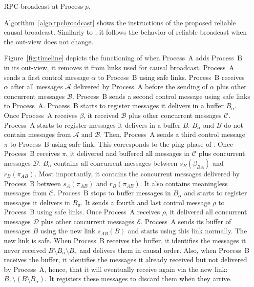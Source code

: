 \begin{algorithm}[h]
  
  \caption{\label{algo:rpcbroadcast}RPC-broadcast at Process $p$.}
\end{algorithm}

Algorithm~\ref{algo:rpcbroadcast} shows the instructions of the proposed
reliable causal broadcast. Similarly to \PCBROADCAST, it follows the behavior of
reliable broadcast when the out-view does not change. 

Figure~\ref{fig:timeline} depicts the functioning of \RPCBROADCAST when
Process~A adds Process~B in its out-view, it removes it from links used for
causal broadcast. Process~A sends a first control message $\alpha$ to Process~B
using safe links. Process~B receives $\alpha$ after all messages $\mathcal{A}$
delivered by Process~A before the sending of $\alpha$ plus other concurrent
messages $\mathcal{B}$. Process~B sends a second control message using safe
links to Process~A. Process~B starts to register messages it delivers in a
buffer $B_\alpha$.  Once Process~A receives $\beta$, it received $\mathcal{B}$
plus other concurrent messages $\mathcal{C}$. Process~A starts to register
messages it delivers in a buffer $B$. $B_\alpha$ and $B$ do not contain messages
from $\mathcal{A}$ and $\mathcal{B}$. Then, Process~A sends a third control
message $\pi$ to Process~B using safe link. This corresponds to the ping phase
of \PCBROADCAST.  Once Process~B receives $\pi$, it delivered and buffered all
messages in $\mathcal{C}$ plus concurrent messages $\mathcal{D}$. $B_\alpha$
contains all concurrent messages between $s_B(\beta_{BA})$ and
$r_B(\pi_{AB})$. Most importantly, it contains the concurrent messages delivered
by Process~B between $s_A(\pi_{AB})$ and $r_B(\pi_{AB})$. It also contains
meaningless messages from $\mathcal{C}$.  Process~B stops to buffer messages in
$B_\alpha$ and starts to register messages it delivers in $B_\pi$. It sends a
fourth and last control message $\rho$ to Process~B using safe links. Once
Process~A receives $\rho$, it delivered all concurrent messages $\mathcal{D}$
plus other concurrent messages $\mathcal{E}$. Process~A sends its buffer of
messages $B$ using the new link $s_{AB}(B)$ and starts using this link
normally. The new link is safe. When Process~B receives the buffer, it
identifies the messages it never received $B\setminus B_\alpha \setminus B_\pi$
and delivers them in causal order. Also, when Process~B receives the buffer, it
identifies the messages it already received but not delivered by Process~A,
hence, that it will eventually receive again via the new link:
$B_\pi \setminus (B \setminus B_\alpha)$.  It registers these messages to
discard them when they arrive.

